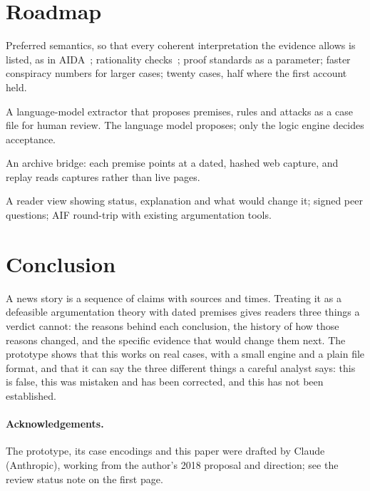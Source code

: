 \documentclass[11pt]{article}
\begin{document}
\section{Roadmap}
\label{sec:future}

\begin{description}[nosep]
\item[Phase 1 (months 1--3)] Preferred semantics, so that every coherent
interpretation the evidence allows is listed, as in AIDA~\cite{aida};
rationality checks~\cite{caminada}; proof standards as a parameter;
faster conspiracy numbers for larger cases; twenty cases, half where the
first account held.
\item[Phase 2 (3--6)] A language-model extractor that proposes premises,
rules and attacks as a case file for human review. The language model
proposes; only the logic engine decides acceptance.
\item[Phase 3 (6--9)] An archive bridge: each premise points at a dated,
hashed web capture, and replay reads captures rather than live pages.
\item[Phase 4 (9--12)] A reader view showing status, explanation and
what would change it; signed peer questions; AIF round-trip with
existing argumentation tools.
\end{description}

\section{Conclusion}

A news story is a sequence of claims with sources and times. Treating it
as a defeasible argumentation theory with dated premises gives readers
three things a verdict cannot: the reasons behind each conclusion, the
history of how those reasons changed, and the specific evidence that
would change them next. The prototype shows that this works on real
cases, with a small engine and a plain file format, and that it can say
the three different things a careful analyst says: this is false, this
was mistaken and has been corrected, and this has not been established.

\paragraph{Acknowledgements.}
The prototype, its case encodings and this paper were drafted by
Claude (Anthropic), working from the author's 2018 proposal and
direction; see the review status note on the first page.
\end{document}
